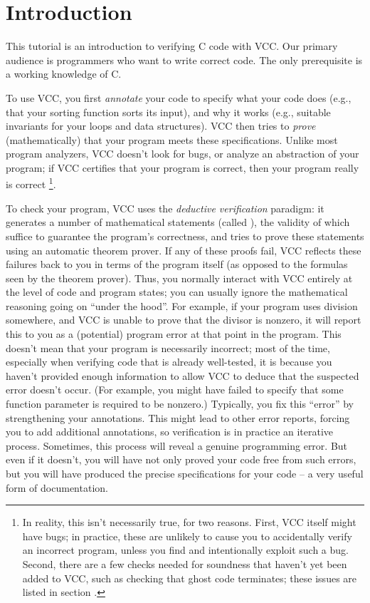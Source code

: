 \section{Introduction}
This tutorial is an introduction to verifying C code with VCC. Our
primary audience is programmers who want to write correct code.
The only prerequisite is a working knowledge of C.

To use VCC, you first \emph{annotate} your code to specify 
what your code does (e.g., that your sorting function sorts its input),
and why it works (e.g., suitable invariants for your loops and 
data structures).
VCC then tries to \emph{prove} (mathematically) that
your program meets these specifications.  Unlike most program
analyzers, VCC doesn't look for bugs, or analyze an abstraction of
your program; if VCC certifies that your program is correct, then your
program really is correct%
\footnote{
  In reality, this isn't necessarily true, for two reasons. 
  First, VCC itself might have bugs; in practice, these are unlikely to cause you to accidentally verify an
  incorrect program, unless you find and intentionally exploit such a
  bug. Second, there are a few checks needed for soundness that haven't yet
  been added to VCC, such as checking that ghost code terminates;
  these issues are listed in section .
  }. 

To check your program, VCC uses the \emph{deductive verification} paradigm:
it generates a number of mathematical
statements (called ), the validity of
which suffice to guarantee the program's correctness, and tries to
prove these statements using an automatic theorem prover. If any of
these proofs fail, VCC reflects these failures back to you in terms of
the program itself (as opposed to the formulas seen by the theorem
prover). Thus, you normally interact with VCC entirely at the level of
code and program states; you can usually ignore the mathematical
reasoning going on ``under the hood''.
For example, if your program uses division
somewhere, and VCC is unable to prove that the divisor is nonzero, it
will report this to you as a (potential) program error at that point in the
program. This doesn't mean that your program is necessarily incorrect;
most of the time, especially when verifying code that is already well-tested,
it is because you haven't provided enough information to allow VCC
to deduce that the suspected error doesn't occur.
(For example, you might have failed to specify that some function
parameter is required to be nonzero.)
Typically, you fix this ``error'' by strengthening your
annotations. This might lead to other error reports, forcing you to 
add additional annotations, so verification is in
practice an iterative process.  
Sometimes, this process will reveal a genuine programming error.
But even if it doesn't, you will have not only proved your code free from 
such errors, but you will have produced the precise specifications for your
code -- a very useful form of documentation.

